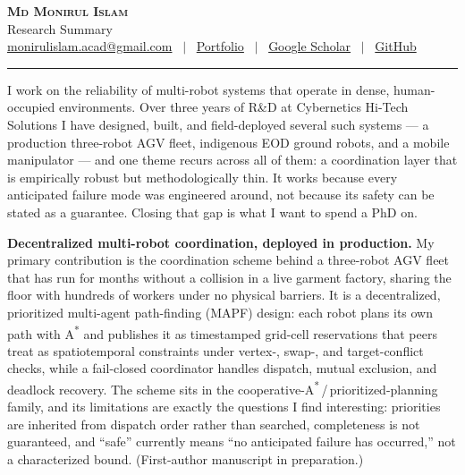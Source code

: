 \documentclass[a4paper,11pt]{article}
\begin{document}
\begin{center}
  {\LARGE \scshape \textbf{Md Monirul Islam}}\\[3pt]
  {\large Research Summary}\\[4pt]
  {\small
    \href{mailto:monirulislam.acad@gmail.com}{monirulislam.acad@gmail.com}
    ~$\vert$~ \href{https://Monirul305.github.io}{Portfolio}
    ~$\vert$~ \href{https://scholar.google.com/citations?user=m-6T5FgAAAAJ&hl=en}{Google Scholar}
    ~$\vert$~ \href{https://github.com/Monirul305}{GitHub}
  }
\end{center}
\vspace{2pt}
\hrule
\vspace{8pt}

I work on the reliability of multi-robot systems that operate in dense,
human-occupied environments. Over three years of R\&D at Cybernetics Hi-Tech
Solutions I have designed, built, and field-deployed several such systems --- a
production three-robot AGV fleet, indigenous EOD ground robots, and a mobile
manipulator --- and one theme recurs across all of them: a coordination layer
that is empirically robust but methodologically thin. It works because every
anticipated failure mode was engineered around, not because its safety can be
stated as a guarantee. Closing that gap is what I want to spend a PhD on.

\textbf{Decentralized multi-robot coordination, deployed in production.} My
primary contribution is the coordination scheme behind a three-robot AGV fleet
that has run for months without a collision in a live garment factory, sharing
the floor with hundreds of workers under no physical barriers. It is a
decentralized, prioritized multi-agent path-finding (MAPF) design: each robot
plans its own path with A\textsuperscript{*} and publishes it as timestamped
grid-cell reservations that peers treat as spatiotemporal constraints under
vertex-, swap-, and target-conflict checks, while a fail-closed coordinator
handles dispatch, mutual exclusion, and deadlock recovery. The scheme sits in
the cooperative-A\textsuperscript{*}\,/\,prioritized-planning family, and its
limitations are exactly the questions I find interesting: priorities are
inherited from dispatch order rather than searched, completeness is not
guaranteed, and ``safe'' currently means ``no anticipated failure has
occurred,'' not a characterized bound. (First-author manuscript in preparation.)
\end{document}
